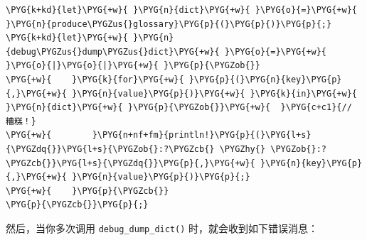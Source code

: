 \begin{Verbatim}[commandchars=\\\{\},breaklines=true,breakanywhere=true,fontsize=\codefont,xleftmargin=17bp]
\PYG{k+kd}{let}\PYG{+w}{ }\PYG{n}{dict}\PYG{+w}{ }\PYG{o}{=}\PYG{+w}{ }\PYG{n}{produce\PYGZus{}glossary}\PYG{p}{(}\PYG{p}{)}\PYG{p}{;}
\PYG{k+kd}{let}\PYG{+w}{ }\PYG{n}{debug\PYGZus{}dump\PYGZus{}dict}\PYG{+w}{ }\PYG{o}{=}\PYG{+w}{ }\PYG{o}{|}\PYG{o}{|}\PYG{+w}{ }\PYG{p}{\PYGZob{}}
\PYG{+w}{    }\PYG{k}{for}\PYG{+w}{ }\PYG{p}{(}\PYG{n}{key}\PYG{p}{,}\PYG{+w}{ }\PYG{n}{value}\PYG{p}{)}\PYG{+w}{ }\PYG{k}{in}\PYG{+w}{ }\PYG{n}{dict}\PYG{+w}{ }\PYG{p}{\PYGZob{}}\PYG{+w}{  }\PYG{c+c1}{// 糟糕！}
\PYG{+w}{        }\PYG{n+nf+fm}{println!}\PYG{p}{(}\PYG{l+s}{\PYGZdq{}}\PYG{l+s}{\PYGZob{}:?\PYGZcb{} \PYGZhy{} \PYGZob{}:?\PYGZcb{}}\PYG{l+s}{\PYGZdq{}}\PYG{p}{,}\PYG{+w}{ }\PYG{n}{key}\PYG{p}{,}\PYG{+w}{ }\PYG{n}{value}\PYG{p}{)}\PYG{p}{;}
\PYG{+w}{    }\PYG{p}{\PYGZcb{}}
\PYG{p}{\PYGZcb{}}\PYG{p}{;}
\end{Verbatim}

然后，当你多次调用 \texttt{debug\_dump\_dict()} 时，就会收到如下错误消息：

